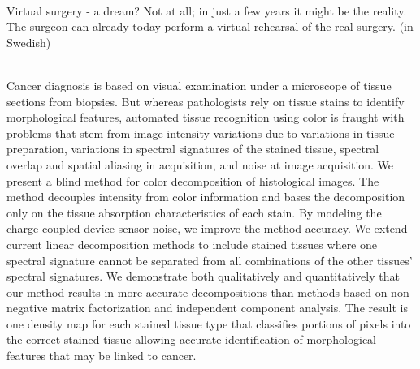 {{\begin{enumerate}
\\ \aabstract
Virtual surgery - a dream? Not at all; in just a few years it might be the reality. The surgeon can already today perform a virtual rehearsal of the real surgery. (in Swedish)
 

\\ \aabstract
Cancer diagnosis is based on visual examination under a microscope of tissue sections from biopsies. But whereas pathologists rely on tissue stains to identify morphological features, automated tissue recognition using color is fraught with problems that stem from image intensity variations due to variations in tissue preparation, variations in spectral signatures of the stained tissue, spectral overlap and spatial aliasing in acquisition, and noise at image acquisition. We present a blind method for color decomposition of histological images. The method decouples intensity from color information and bases the decomposition only on the tissue absorption characteristics of each stain. By modeling the charge-coupled device sensor noise, we improve the method accuracy. We extend current linear decomposition methods to include stained tissues where one spectral signature cannot be separated from all combinations of the other tissues' spectral signatures. We demonstrate both qualitatively and quantitatively that our method results in more accurate decompositions than methods based on non-negative matrix factorization and independent component analysis. The result is one density map for each stained tissue type that classifies portions of pixels into the correct stained tissue allowing accurate identification of morphological features that may be linked to cancer.
 


\end{enumerate}}}
